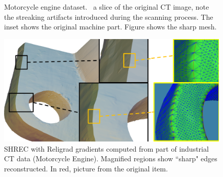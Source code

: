 \begin{figure}[t]
	\centering
	\caption{Motorcycle engine dataset.~\protect{} a slice of the original CT image, note the streaking artifacts introduced during the scanning process.
		The inset shows the original machine part. Figure \protect{} shows the sharp mesh.}
	\label{fig:setA.crop1}
\end{figure}


\begin{figure}[t]
\centering
	\includegraphics[width=\linewidth]{images/ictsetA_3.eps}
	\caption{SHREC with Religrad gradients computed from part of industrial CT data (Motorcycle Engine). Magnified regions show ``sharp" edges reconstructed. In red, picture from the original item.}
	\label{fig:ict:hondaEng}
\end{figure}

